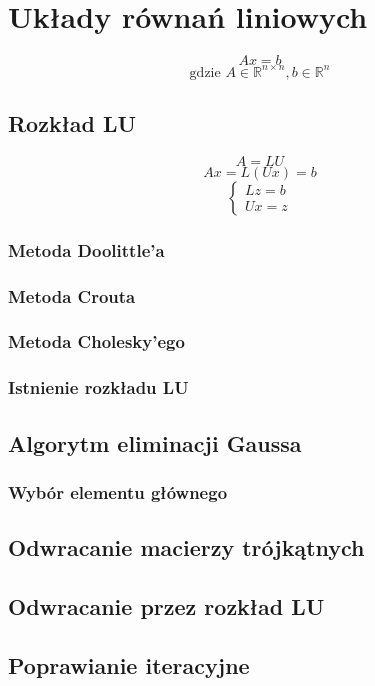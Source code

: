 \documentclass[../mn-notatki.tex]{subfiles}
\begin{document}
\section{Układy równań liniowych}

\begin{tcolorbox}
\[
Ax = b
\]
\[
\text{gdzie } A \in \mathbb{R}^{n \times n}, b \in \mathbb{R}^n
\]
\end{tcolorbox}

\subsection{Rozkład LU}

\begin{tcolorbox}
\[
A = LU
\]
\[
Ax = L(Ux) = b
\]
\[
\begin{cases}
Lz = b\\
Ux = z
\end{cases}
\]
\end{tcolorbox}

\subsubsection{Metoda Doolittle'a}
\subsubsection{Metoda Crouta}
\subsubsection{Metoda Cholesky'ego}
\subsubsection{Istnienie rozkładu LU}

\subsection{Algorytm eliminacji Gaussa}
\subsubsection{Wybór elementu głównego}

\subsection{Odwracanie macierzy trójkątnych}
\subsection{Odwracanie przez rozkład LU}
\subsection{Poprawianie iteracyjne}

\pagebreak
\end{document}
